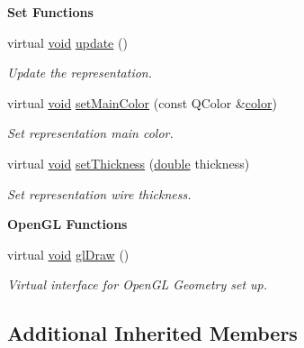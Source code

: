 \begin{Indent}{\bf Set Functions}\par
\begin{DoxyCompactItemize}
\item 
virtual \hyperlink{group___u_a_v_objects_plugin_ga444cf2ff3f0ecbe028adce838d373f5c}{void} \hyperlink{class_g_l_c___rep_fly_mover_aaca5b8966c6da172561ce6f17e3f05ce}{update} ()
\begin{DoxyCompactList}\small\item\em Update the representation. \end{DoxyCompactList}\item 
virtual \hyperlink{group___u_a_v_objects_plugin_ga444cf2ff3f0ecbe028adce838d373f5c}{void} \hyperlink{class_g_l_c___rep_fly_mover_af7fbf9479ab211a5474860877044fcc1}{set\-Main\-Color} (const Q\-Color \&\hyperlink{glext_8h_a3ea846f998d64f079b86052b6c4193a8}{color})
\begin{DoxyCompactList}\small\item\em Set representation main color. \end{DoxyCompactList}\item 
virtual \hyperlink{group___u_a_v_objects_plugin_ga444cf2ff3f0ecbe028adce838d373f5c}{void} \hyperlink{class_g_l_c___rep_fly_mover_a9a3caf14f53f134210d0084f9bb45b06}{set\-Thickness} (\hyperlink{_super_l_u_support_8h_a8956b2b9f49bf918deed98379d159ca7}{double} thickness)
\begin{DoxyCompactList}\small\item\em Set representation wire thickness. \end{DoxyCompactList}\end{DoxyCompactItemize}
\end{Indent}
\begin{Indent}{\bf Open\-G\-L Functions}\par
\begin{DoxyCompactItemize}
\item 
virtual \hyperlink{group___u_a_v_objects_plugin_ga444cf2ff3f0ecbe028adce838d373f5c}{void} \hyperlink{class_g_l_c___rep_fly_mover_a9bad17272d09e34064f9068f3378c809}{gl\-Draw} ()
\begin{DoxyCompactList}\small\item\em Virtual interface for Open\-G\-L Geometry set up. \end{DoxyCompactList}\end{DoxyCompactItemize}
\end{Indent}
\subsection*{Additional Inherited Members}


